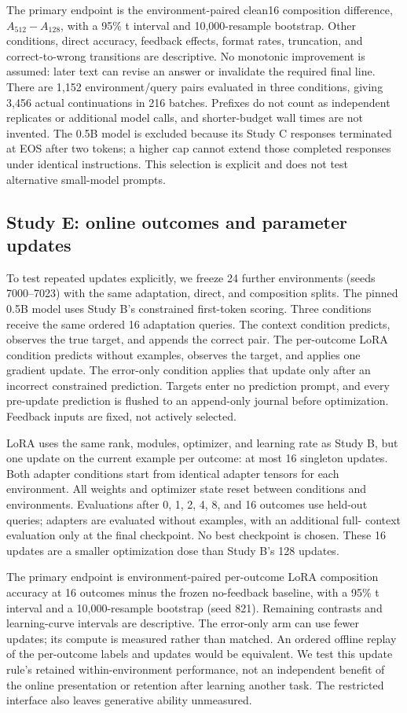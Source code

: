 \documentclass[11pt]{article}
\begin{document}
The primary endpoint is the environment-paired clean16 composition difference,
$A_{512}-A_{128}$, with a 95\% t interval and 10,000-resample bootstrap.
Other conditions, direct accuracy, feedback effects, format rates, truncation,
and correct-to-wrong transitions are descriptive. No monotonic improvement is
assumed: later text can revise an answer or invalidate the required final line.
There are 1,152 environment/query pairs evaluated in three conditions, giving
3,456 actual continuations in 216 batches. Prefixes do not count as independent
replicates or additional model calls, and shorter-budget wall times are not
invented. The 0.5B model is excluded because its Study C responses terminated
at EOS after two tokens; a higher cap cannot extend those completed responses
under identical instructions. This selection is explicit and does not test
alternative small-model prompts.

\subsection{Study E: online outcomes and parameter updates}
To test repeated updates explicitly, we freeze 24 further environments
(seeds 7000--7023) with the same adaptation, direct, and composition splits.
The pinned 0.5B model uses Study B's constrained first-token scoring. Three
conditions receive the same ordered 16 adaptation queries. The context
condition predicts, observes the true target, and appends the correct pair.
The per-outcome LoRA condition predicts without examples, observes the target,
and applies one gradient update. The error-only condition applies that update
only after an incorrect constrained prediction. Targets enter no prediction
prompt, and every pre-update prediction is flushed to an append-only journal
before optimization. Feedback inputs are fixed, not actively selected.

LoRA uses the same rank, modules, optimizer, and learning rate as Study B,
but one update on the current example per outcome: at most 16 singleton
updates. Both adapter conditions start from identical adapter tensors for each
environment. All weights and optimizer state reset between conditions and
environments. Evaluations after 0, 1, 2, 4, 8, and 16 outcomes use held-out
queries; adapters are evaluated without examples, with an additional full-
context evaluation only at the final checkpoint. No best checkpoint is chosen.
These 16 updates are a smaller optimization dose than Study B's 128 updates.

The primary endpoint is environment-paired per-outcome LoRA composition
accuracy at 16 outcomes minus the frozen no-feedback baseline, with a 95\% t
interval and a 10,000-resample bootstrap (seed 821). Remaining contrasts and
learning-curve intervals are descriptive. The error-only arm can use fewer
updates; its compute is measured rather than matched. An ordered offline
replay of the per-outcome labels and updates would be equivalent. We test this
update rule's retained within-environment performance, not an independent
benefit of the online presentation or retention after learning another task.
The restricted interface also leaves generative ability unmeasured.
\end{document}
